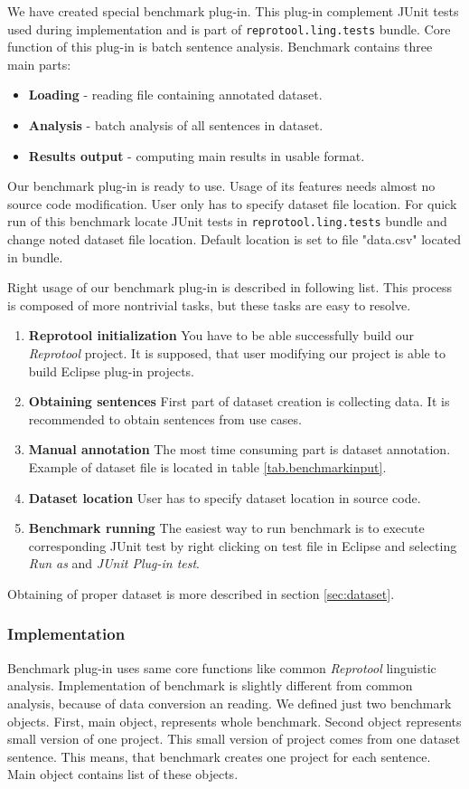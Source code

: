 We have created special benchmark plug-in. This plug-in complement JUnit tests used during implementation and is part of {\tt reprotool.ling.tests} bundle. Core function of this plug-in is batch sentence analysis. Benchmark contains three main parts:

\begin{itemize}
\item {\bf Loading} - reading file containing annotated dataset.
\item {\bf Analysis} - batch analysis of all sentences in dataset.
\item {\bf Results output} - computing main results in usable format.
\end{itemize}

Our benchmark plug-in is ready to use. Usage of its features needs almost no source code modification. User only has to specify dataset file location. For quick run of this benchmark locate JUnit tests in {\tt reprotool.ling.tests} bundle and change noted dataset file location. Default location is set to file "data.csv" located in bundle.

Right usage of our benchmark plug-in is described in following list. This process is composed of more nontrivial tasks, but these tasks are easy to resolve.

\begin{enumerate}
\item {\bf Reprotool initialization} You have to be able successfully build our \emph{Reprotool} project. It is supposed, that user modifying our project is able to build Eclipse plug-in projects.
\item {\bf Obtaining sentences} First part of dataset creation is collecting data. It is recommended to obtain sentences from use cases.
\item {\bf Manual annotation} The most time consuming part is dataset annotation. Example of dataset file is located in table \ref{tab.benchmarkinput}.
\item {\bf Dataset location} User has to specify dataset location in source code.
\item {\bf Benchmark running} The easiest way to run benchmark is to execute corresponding JUnit test by right clicking on test file in Eclipse and selecting \emph{Run as} and \emph{JUnit Plug-in test}.
\end{enumerate}

Obtaining of proper dataset is more described in section \ref{sec:dataset}. 

\subsubsection{Implementation}
Benchmark plug-in uses same core functions like common \emph{Reprotool} linguistic analysis. Implementation of benchmark is slightly different from common analysis, because of data conversion an reading. We defined just two benchmark objects. First, main object, represents whole benchmark. Second object represents small version of one project. This small version of project comes from one dataset sentence. This means, that benchmark creates one project for each sentence. Main object contains list of these objects.

